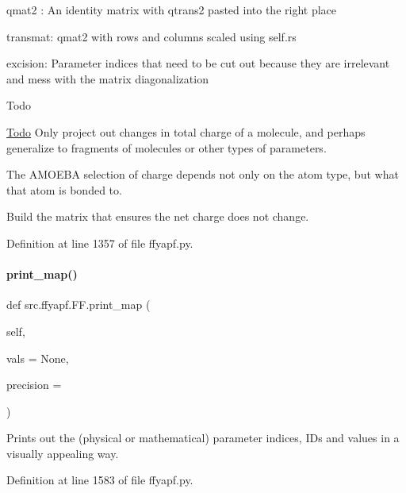 \textquotesingle{}qmat2\textquotesingle{} \+: An identity matrix with \textquotesingle{}qtrans2\textquotesingle{} pasted into the right place

\textquotesingle{}transmat\textquotesingle{}\+: \textquotesingle{}qmat2\textquotesingle{} with rows and columns scaled using self.\+rs

\textquotesingle{}excision\textquotesingle{}\+: Parameter indices that need to be \textquotesingle{}cut out\textquotesingle{} because they are irrelevant and mess with the matrix diagonalization

\begin{DoxyRefDesc}{Todo}
\item[\hyperlink{todo__todo000005}{Todo}]Only project out changes in total charge of a molecule, and perhaps generalize to fragments of molecules or other types of parameters. 

The A\+M\+O\+E\+BA selection of charge depends not only on the atom type, but what that atom is bonded to. \end{DoxyRefDesc}
Build the matrix that ensures the net charge does not change. 

Definition at line 1357 of file ffyapf.\+py.

\mbox{\label{classsrc_1_1ffyapf_1_1FF_a1f2342882083a5b59d8d76d13d6f666d}} 
\paragraph{\texorpdfstring{print\+\_\+map()}{print\_map()}}
{\footnotesize\ttfamily def src.\+ffyapf.\+F\+F.\+print\+\_\+map (\begin{DoxyParamCaption}\item[{}]{self,  }\item[{}]{vals = {\ttfamily None},  }\item[{}]{precision = {} }\end{DoxyParamCaption})}



Prints out the (physical or mathematical) parameter indices, I\+Ds and values in a visually appealing way. 



Definition at line 1583 of file ffyapf.\+py.

